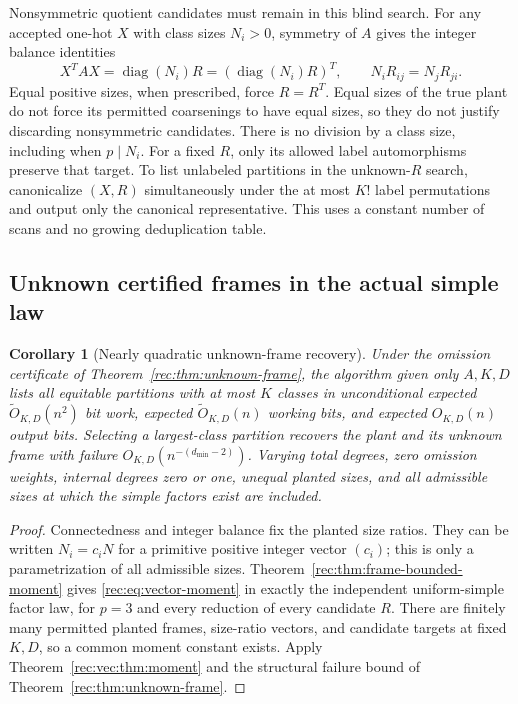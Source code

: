\documentclass[11pt]{article}
\newtheorem{corollary}[theorem]{Corollary}
\theoremstyle{definition}
\theoremstyle{remark}
\newcommand{\1}{\mathbf 1}
\DeclareMathOperator{\diag}{diag}
\begin{document}
Nonsymmetric quotient candidates must remain in this blind search.
For any accepted one-hot $X$ with class sizes $N_i>0$, symmetry of
$A$ gives the integer balance identities
\[
 X^TAX=\diag(N_i)R=(\diag(N_i)R)^T,
 \qquad N_iR_{ij}=N_jR_{ji}.
\]
Equal positive sizes, when prescribed, force $R=R^T$. Equal sizes
of the true plant do not force its permitted coarsenings to have
equal sizes, so they do not justify discarding nonsymmetric candidates.
There is no division by a class size, including when $p\mid N_i$.
For a fixed $R$, only its allowed label automorphisms preserve that
target. To list unlabeled partitions in the unknown-$R$ search,
canonicalize $(X,R)$ simultaneously under the at most $K!$ label
permutations and output only the canonical representative. This
uses a constant number of scans and no growing deduplication table.

\subsection{Unknown certified frames in the actual simple law}
\begin{corollary}[Nearly quadratic unknown-frame recovery]
\label{rec:vec:cor:frame}
Under the omission certificate of
Theorem~\ref{rec:thm:unknown-frame}, the algorithm given only $A,K,D$
lists all equitable partitions with at most $K$ classes in
unconditional expected $\widetilde O_{K,D}(n^2)$ bit work, expected
$\widetilde O_{K,D}(n)$ working bits, and expected $O_{K,D}(n)$
output bits. Selecting a largest-class partition recovers the plant
and its unknown frame with failure $O_{K,D}(n^{-(d_{\min}-2)})$.
Varying total degrees, zero omission weights, internal degrees zero or
one, unequal planted sizes, and all
admissible sizes at which the simple factors exist are included.
\end{corollary}
\begin{proof}
Connectedness and integer balance fix the planted size ratios.
They can be written $N_i=c_iN$ for a primitive positive integer vector
$(c_i)$; this is only a parametrization of all admissible sizes.
Theorem~\ref{rec:thm:frame-bounded-moment} gives
\eqref{rec:eq:vector-moment} in exactly the independent uniform-simple
factor law, for $p=3$ and every reduction of every candidate $R$.
There are finitely many permitted planted frames, size-ratio vectors,
and candidate targets at fixed $K,D$, so a common moment constant
exists. Apply Theorem~\ref{rec:vec:thm:moment} and the structural failure
bound of Theorem~\ref{rec:thm:unknown-frame}.
\end{proof}
\end{document}
